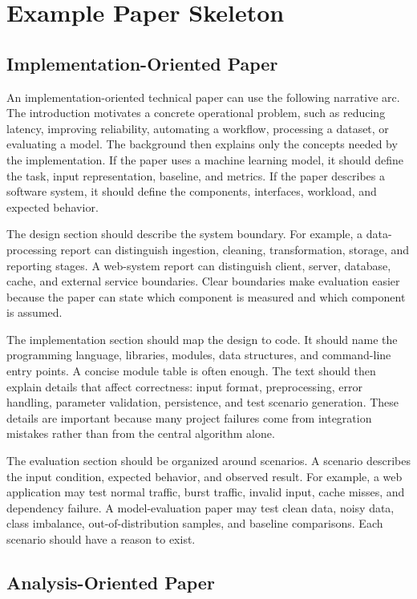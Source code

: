 \section{Example Paper Skeleton}

\subsection{Implementation-Oriented Paper}

An implementation-oriented technical paper can use the following narrative arc. The introduction motivates a concrete operational problem, such as reducing latency, improving reliability, automating a workflow, processing a dataset, or evaluating a model. The background then explains only the concepts needed by the implementation. If the paper uses a machine learning model, it should define the task, input representation, baseline, and metrics. If the paper describes a software system, it should define the components, interfaces, workload, and expected behavior.

The design section should describe the system boundary. For example, a data-processing report can distinguish ingestion, cleaning, transformation, storage, and reporting stages. A web-system report can distinguish client, server, database, cache, and external service boundaries. Clear boundaries make evaluation easier because the paper can state which component is measured and which component is assumed.

The implementation section should map the design to code. It should name the programming language, libraries, modules, data structures, and command-line entry points. A concise module table is often enough. The text should then explain details that affect correctness: input format, preprocessing, error handling, parameter validation, persistence, and test scenario generation. These details are important because many project failures come from integration mistakes rather than from the central algorithm alone.

The evaluation section should be organized around scenarios. A scenario describes the input condition, expected behavior, and observed result. For example, a web application may test normal traffic, burst traffic, invalid input, cache misses, and dependency failure. A model-evaluation paper may test clean data, noisy data, class imbalance, out-of-distribution samples, and baseline comparisons. Each scenario should have a reason to exist.

\subsection{Analysis-Oriented Paper}

